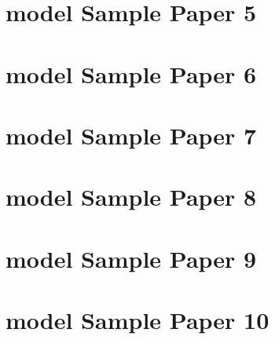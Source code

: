 \documentclass[
  letterpaper,
  DIV=11,
  numbers=noendperiod]{scrreprt}
\begin{document}

\hypertarget{model-sample-paper-5}{%
\section*{model Sample Paper 5}\label{model-sample-paper-5}}


\hypertarget{model-sample-paper-6}{%
\section*{model Sample Paper 6}\label{model-sample-paper-6}}


\hypertarget{model-sample-paper-7}{%
\section*{model Sample Paper 7}\label{model-sample-paper-7}}


\hypertarget{model-sample-paper-8}{%
\section*{model Sample Paper 8}\label{model-sample-paper-8}}


\hypertarget{model-sample-paper-9}{%
\section*{model Sample Paper 9}\label{model-sample-paper-9}}


\hypertarget{model-sample-paper-10}{%
\section*{model Sample Paper 10}\label{model-sample-paper-10}}

\end{document}
